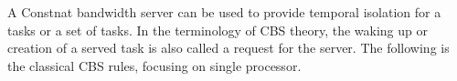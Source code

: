 %
%
A Constnat bandwidth server can be used to provide temporal isolation
for a tasks or a set of tasks. In the terminology of CBS theory, the 
waking up or creation of a served task is also called a request for 
the server. The following is the classical CBS rules, focusing on 
single processor.

